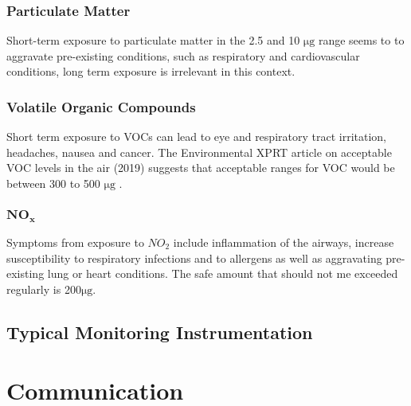 \subsubsection{Particulate Matter }
Short-term exposure to particulate matter in the 2.5 and 10 $ \si{\micro\gram} $ range seems to to aggravate pre-existing conditions, such as respiratory and cardiovascular conditions\cite{pmparticles}, long term exposure is irrelevant in this context.





\subsubsection{Volatile Organic Compounds}
Short term exposure to VOCs can lead to eye and respiratory tract irritation, headaches, nausea and cancer\cite{safevocs}.
The Environmental XPRT article on acceptable VOC levels in the air (2019) \cite{vocs} suggests that acceptable ranges for VOC would be between 300 to 500 $ \si{\micro\gram} $ .

\subsubsection{$\mathbf{NO_x}$}
Symptoms from exposure to $NO_2$ include inflammation of the airways, increase susceptibility to respiratory infections and to allergens as well as aggravating pre-existing lung or heart conditions. The safe amount that should not me exceeded regularly is 200$ \si{\micro\gram} $.\cite{safenox}


\subsection{Typical Monitoring Instrumentation}


\section{Communication}

\section{}
